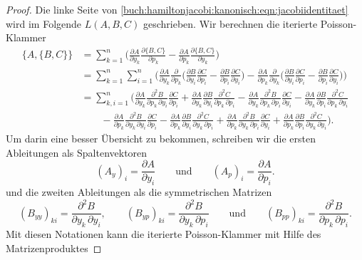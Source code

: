 \begin{proof}
Die linke Seite von
\eqref{buch:hamiltonjacobi:kanonisch:eqn:jacobiidentitaet}
wird im Folgende $L(A,B,C)$ geschrieben.
Wir berechnen die iterierte Poisson-Klammer
\begin{align*}
\{A,\{B,C\}\}
&=
\sum_{k=1}^n
\biggl(
\frac{\partial A}{\partial y_k} 
\frac{\partial \{B,C\}}{\partial p_k}
-
\frac{\partial A}{\partial p_k} 
\frac{\partial \{B,C\}}{\partial y_k}
\biggr)
\\
&=
\sum_{k=1}^n\sum_{i=1}^n
\biggl(
\frac{\partial A}{\partial y_k}
\frac{\partial}{\partial p_k}\biggl(
\frac{\partial B}{\partial y_i}
\frac{\partial C}{\partial p_i}
-
\frac{\partial B}{\partial p_i}
\frac{\partial C}{\partial y_i}
\biggr)
-
\frac{\partial A}{\partial p_k}
\frac{\partial}{\partial y_k}\biggl(
\frac{\partial B}{\partial y_i}
\frac{\partial C}{\partial p_i}
-
\frac{\partial B}{\partial p_i}
\frac{\partial C}{\partial y_i}
\biggr)
\biggr)
\\
&=
\sum_{k,i=1}^n
\bigg(
\frac{\partial A}{\partial y_k}
\frac{\partial^2 B}{\partial p_k\,\partial y_i}
\frac{\partial C}{\partial p_i}
+
\frac{\partial A}{\partial y_k}
\frac{\partial B}{\partial y_i}
\frac{\partial^2 C}{\partial p_k\,\partial p_i}
-
\frac{\partial A}{\partial y_k}
\frac{\partial^2 B}{\partial p_k\,\partial p_i}
\frac{\partial C}{\partial y_i}
-
\frac{\partial A}{\partial y_k}
\frac{\partial B}{\partial p_i}
\frac{\partial^2 C}{\partial p_k\,\partial y_i}
\\
&\qquad
-
\frac{\partial A}{\partial p_k}
\frac{\partial^2 B}{\partial y_k\,\partial y_i}
\frac{\partial C}{\partial p_i}
-
\frac{\partial A}{\partial p_k}
\frac{\partial B}{\partial y_i}
\frac{\partial^2 C}{\partial y_k\,\partial p_i}
+
\frac{\partial A}{\partial p_k}
\frac{\partial^2 B}{\partial y_k\,\partial p_i}
\frac{\partial C}{\partial y_i}
+
\frac{\partial A}{\partial p_k}
\frac{\partial B}{\partial p_i}
\frac{\partial^2 C}{\partial y_k\,\partial y_i}
\bigg).
\end{align*}
Um darin eine besser Übersicht zu bekommen, schreiben wir die ersten
Ableitungen als Spaltenvektoren
\[
(A_y)_i = \frac{\partial A}{\partial y_i}
\qquad\text{und}\qquad
(A_p)_i = \frac{\partial A}{\partial p_i}.
\]
und die zweiten Ableitungen als die symmetrischen Matrizen
\[
(B_{yy})_{ki} = \frac{\partial^2 B}{\partial y_k\,\partial y_i}
,
\qquad
(B_{yp})_{ki} = \frac{\partial^2 B}{\partial y_k\,\partial p_i}
\qquad\text{und}\qquad
(B_{pp})_{ki} = \frac{\partial^2 B}{\partial p_k\,\partial p_i}.
\]
Mit diesen Notationen
kann die iterierte Poisson-Klammer mit Hilfe des Matrizenproduktes

\end{proof}
